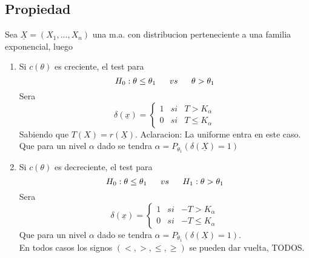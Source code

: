 \documentclass[titlepage,a4paper]{article}
\begin{document}
\subsection{Propiedad}
Sea $\underline{X} = (X_{1},...,X_{n})$ una m.a. con distribucion perteneciente a una familia exponencial, luego
\begin{enumerate}
    \item Si $c(\theta)$ es creciente, el test para 
    \begin{equation*}
        H_{0}: \theta \leq \theta_{1} \hspace{16px} vs \hspace{16px} \theta > \theta_{1}
    \end{equation*}
    Sera
    \begin{equation*}
        \delta(\underline{x})= \left\{ \begin{array}{lcc}
        1 &   si  & T > K_{\alpha} \\
        0 &  si & T \leq K_{\alpha}
        \end{array}
        \right.
    \end{equation*}
    Sabiendo que $T(X) = r(\underline{X})$. Aclaracion: La uniforme entra en este caso.\\
    Que para un nivel $\alpha$ dado se tendra $\alpha = P_{\theta_{1}} (\delta(\underline{X})=1 )$
    \item Si $c(\theta)$ es decreciente, el test para 
    \begin{equation*}
        H_{0}: \theta \leq \theta_{1} \hspace{16px} vs \hspace{16px} H_{1}:\theta > \theta_{1}
    \end{equation*}
    Sera
    \begin{equation*}
        \delta(\underline{x})= \left\{ \begin{array}{lcc}
            1 &   si  & -T > K_{\alpha} \\
            0 &  si & -T \leq K_{\alpha}
            \end{array}
            \right.
    \end{equation*}
    Que para un nivel $\alpha$ dado se tendra $\alpha = P_{\theta_{1}} (\delta(\underline{X})=1 )$.\\
    En todos casos los signos $(<,>,\leq,\geq)$  se pueden dar vuelta, TODOS.
\end{enumerate}
\subsection{}
\end{document}
